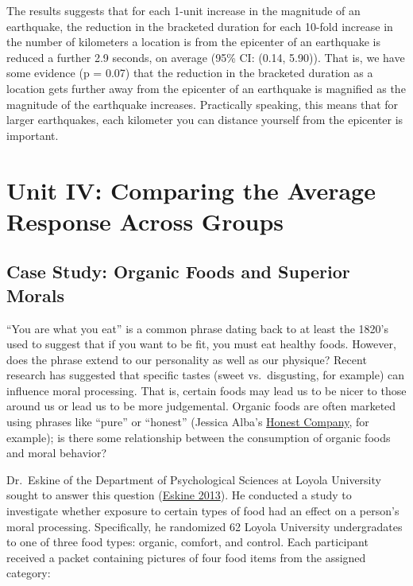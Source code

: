 \documentclass[
]{book}
\theoremstyle{plain}
\theoremstyle{mydefn}
\theoremstyle{myexmpl}
\theoremstyle{remark}
\begin{document}
The results suggests that for each 1-unit increase in the magnitude of an earthquake, the reduction in the bracketed duration for each 10-fold increase in the number of kilometers a location is from the epicenter of an earthquake is reduced a further 2.9 seconds, on average (95\% CI: (0.14, 5.90)). That is, we have some evidence (p = 0.07) that the reduction in the bracketed duration as a location gets further away from the epicenter of an earthquake is magnified as the magnitude of the earthquake increases. Practically speaking, this means that for larger earthquakes, each kilometer you can distance yourself from the epicenter is important.

\hypertarget{part-unit-iv-comparing-the-average-response-across-groups}{%
\part{Unit IV: Comparing the Average Response Across Groups}\label{part-unit-iv-comparing-the-average-response-across-groups}}

\hypertarget{CaseOrganic}{%
\chapter{Case Study: Organic Foods and Superior Morals}\label{CaseOrganic}}

``You are what you eat'' is a common phrase dating back to at least the 1820's used to suggest that if you want to be fit, you must eat healthy foods. However, does the phrase extend to our personality as well as our physique? Recent research has suggested that specific tastes (sweet vs.~disgusting, for example) can influence moral processing. That is, certain foods may lead us to be nicer to those around us or lead us to be more judgemental. Organic foods are often marketed using phrases like ``pure'' or ``honest'' (Jessica Alba's \href{https://www.honest.com/}{Honest Company}, for example); is there some relationship between the consumption of organic foods and moral behavior?

Dr.~Eskine of the Department of Psychological Sciences at Loyola University sought to answer this question (\protect\hyperlink{ref-Eskine2013}{Eskine 2013}). He conducted a study to investigate whether exposure to certain types of food had an effect on a person's moral processing. Specifically, he randomized 62 Loyola University undergradates to one of three food types: organic, comfort, and control. Each participant received a packet containing pictures of four food items from the assigned category:
\end{document}
